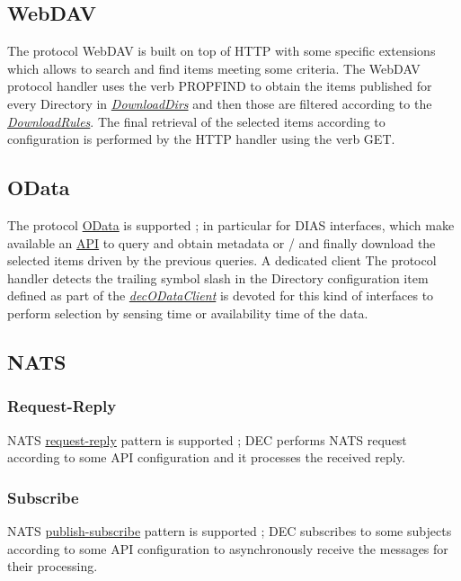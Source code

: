 \documentclass[dec_sum_main.tex]{subfiles}
\begin{document}
\subsection{WebDAV}
The protocol WebDAV is built on top of HTTP with some specific extensions which allows to search and find items meeting some criteria. The WebDAV protocol handler uses the verb PROPFIND to obtain the items published for every Directory in \hyperref[DownloadDirs]{\textit{DownloadDirs}} and then those are filtered according to the \hyperref[DownloadRules]{\textit{DownloadRules}}.
The final retrieval of the selected items according to configuration is performed by the HTTP handler using the verb GET.

\subsection{OData}
The protocol \href{https://docs.oasis-open.org/odata/odata/v4.01/odata-v4.01-part1-protocol.html}{OData} is supported ; in particular for DIAS interfaces, which make available an \href{https://scihub.copernicus.eu/userguide/ODataAPI}{API} to query and obtain metadata or / and finally download the selected items driven by the previous queries.
A dedicated client The protocol handler detects the trailing symbol slash in the Directory configuration item defined as part of the \hyperref[decODataClient]{\textit{decODataClient}} is devoted for this kind of interfaces to perform selection by sensing time or availability time of the data.

\subsection{NATS}
\subsubsection{Request-Reply}
NATS \href{https://docs.nats.io/nats-concepts/core-nats/reqreply}{request-reply} pattern is supported ; DEC performs NATS request according to some API configuration and it processes the received reply.
\subsubsection{Subscribe}
NATS \href{https://docs.nats.io/nats-concepts/core-nats/pubsub}{publish-subscribe} pattern is supported ; DEC subscribes to some subjects according to some API configuration to asynchronously receive the messages for their processing. \newline
\end{document}
